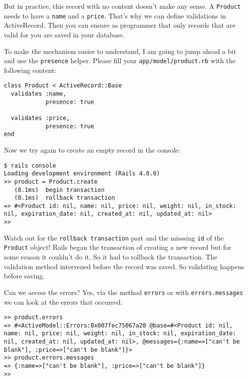 \documentclass[a4paper]{book}
\newcounter{tab}[chapter]
\begin{document}
But in practice, this record with no content doesn't make any sense. A \texttt{Product} needs to have a \texttt{name} and a \texttt{price}. That's why we can define validations in ActiveRecord. Then you can ensure as programmer that only records that are valid for you are saved in your database.

To make the mechanism easier to understand, I am going to jump ahead a bit and use the \texttt{presence} helper. Please fill your \texttt{app/model/product.rb} with the following content:

\begin{shaded}\begin{verbatim}
class Product < ActiveRecord::Base
  validates :name,
            presence: true

  validates :price,
            presence: true
end
\end{verbatim}\end{shaded}

Now we try again to create an empty record in the console:

\begin{shaded}\begin{verbatim}
$ rails console
Loading development environment (Rails 4.0.0)
>> product = Product.create
   (0.1ms)  begin transaction
   (0.1ms)  rollback transaction
=> #<Product id: nil, name: nil, price: nil, weight: nil, in_stock: nil, expiration_date: nil, created_at: nil, updated_at: nil>
>>
\end{verbatim}\end{shaded}

Watch out for the \texttt{rollback transaction} part and the misssing \texttt{id} of the \texttt{Product} object! Rails began the transaction of creating a new record but for some reason it couldn't do it. So it had to rollback the transaction. The validation method intervened before the record was saved. So validating happens before saving.

Can we access the errors? Yes, via the method \texttt{errors} or with \texttt{errors.messages} we can look at the errors that occurred:

\begin{shaded}\begin{verbatim}
>> product.errors
=> #<ActiveModel::Errors:0x007fec75067a20 @base=#<Product id: nil, name: nil, price: nil, weight: nil, in_stock: nil, expiration_date: nil, created_at: nil, updated_at: nil>, @messages={:name=>["can't be blank"], :price=>["can't be blank"]}>
>> product.errors.messages
=> {:name=>["can't be blank"], :price=>["can't be blank"]}
>>
\end{verbatim}\end{shaded}
\end{document}
